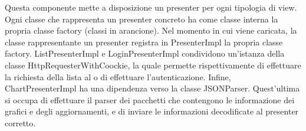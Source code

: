 Questa componente mette a disposizione un presenter per ogni tipologia di view. Ogni classe che rappresenta un presenter concreto ha come classe interna la propria classe factory (classi in arancione). Nel momento in cui viene caricata, la classe rappresentante un presenter registra in PresenterImpl la propria classe factory. ListPresenterImpl e LoginPresenterImpl condividono un'istanza della classe HttpRequesterWithCoockie, la quale permette rispettivamente di effettuare la richiesta della lista al  o di effettuare l'autenticazione. 
Infine, ChartPresenterImpl ha una dipendenza verso la classe JSONParser. Quest'ultima si occupa di effettuare il parser dei pacchetti  che contengono le informazione dei grafici e degli aggiornamenti, e di inviare le informazioni decodificate al presenter corretto.
